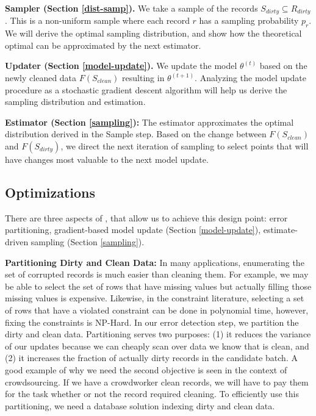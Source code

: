 \noindent\textbf{Sampler (Section \ref{dist-samp}). } We take a sample of the records $S_{dirty} \subseteq R_{dirty}$. This is a non-uniform sample where each record $r$ has a sampling probability $p_r$.
We will derive the optimal sampling distribution, and show how the theoretical optimal can be approximated by the next estimator.

\vspace{0.5em}

\noindent\textbf{Updater (Section \ref{model-update}). } We update the model $\theta^{(t)}$ based on the newly cleaned data $F(S_{clean})$ resulting in $\theta^{(t+1)}$. Analyzing the model update procedure as a stochastic gradient descent algorithm will help us derive the sampling distribution and estimation.

\vspace{0.5em}

\noindent\textbf{Estimator (Section \ref{sampling}): } The estimator approximates the optimal distribution derived in the Sample step. Based on the change between $F(S_{clean})$ and $F(S_{dirty})$, we direct the next iteration of sampling to select points that will have changes most valuable to the next model update.

\iffalse
\subsection{Optimizations}
There are three aspects of \sys, that allow us to achieve this design point: error partitioning, gradient-based model update (Section \ref{model-update}), estimate-driven sampling (Section \ref{sampling}).

\vspace{0.5em}

\noindent\textbf{Partitioning Dirty and Clean Data: } In many applications, enumerating the set of corrupted records is much easier than cleaning them. For example, we may be able to select the set of rows that have missing values but actually filling those missing values is expensive. Likewise, in the constraint literature, selecting a set of rows that have a violated constraint can be done in polynomial time, however, fixing the constraints is NP-Hard.
In our error detection step, we partition the dirty and clean data.
Partitioning serves two purposes: (1) it reduces the variance of our updates because we can cheaply scan over data we know that is clean, and (2) it increases the fraction of actually dirty records in the candidate batch.
A good example of why we need the second objective is seen in the context of crowdsourcing.
If we have a crowdworker clean records, we will have to pay them for the task whether or not the record required cleaning.
To efficiently use this partitioning, we need a database solution indexing dirty and clean data.

